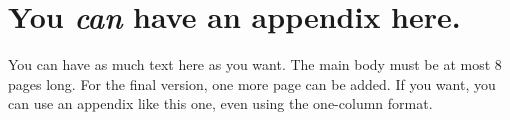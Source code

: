 \documentclass[nohyperref]{article}
\theoremstyle{plain}
\theoremstyle{definition}
\theoremstyle{remark}
\begin{document}




\newpage
\appendix
\onecolumn
\section{You \emph{can} have an appendix here.}

You can have as much text here as you want. The main body must be at most $8$ pages long.
For the final version, one more page can be added.
If you want, you can use an appendix like this one, even using the one-column format.
\end{document}
